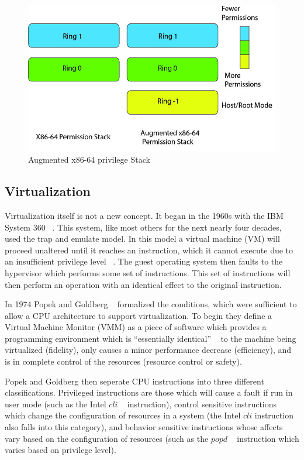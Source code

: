 \begin{figure}\label{PermStack}
	  \centering
	  \includegraphics[width=\textwidth]{figures/AugmentedPerm.jpg}
	  \caption{Augmented x86-64 privilege Stack}
\end{figure}

\subsection{Virtualization}

Virtualization itself is not a new concept. It began in the 1960s with the IBM System 360 ~\cite{vleck_ibm_2010}. This system, like most others for the next nearly four decades, used the trap and emulate model. In this model a virtual machine (VM) will proceed unaltered until it reaches an instruction, which it cannot execute due to an insufficient privilege level ~\cite{popek_formal_1974}. The guest operating system then faults to the hypervisor which performs some set of instructions. This set of instructions will then perform an operation with an identical effect to the original instruction. 

In 1974 Popek and Goldberg ~\cite{popek_formal_1974} formalized the conditions, which were sufficient to allow a CPU architecture to support virtualization. To begin they define a Virtual Machine Monitor (VMM) as a piece of software which provides a programming environment which is ``essentially identical'' ~\cite{popek_formal_1974} to the machine being virtualized (fidelity), only causes a minor performance decrease (efficiency), and is in complete control of the resources (resource control or safety).

Popek and Goldberg then seperate CPU instructions into three different classifications.  Privileged instructions are those which will cause a fault if run in user mode (such as the Intel $cli$ ~\cite{_intel_2015} instruction), control sensitive instructions which change the configuration of resources in a system (the Intel $cli$ instruction also falls into this category),  and behavior sensitive instructions whose affects vary based on the configuration of resources (such as the $popd$ ~\cite{_intel_2015} instruction which varies based on privilege level).

